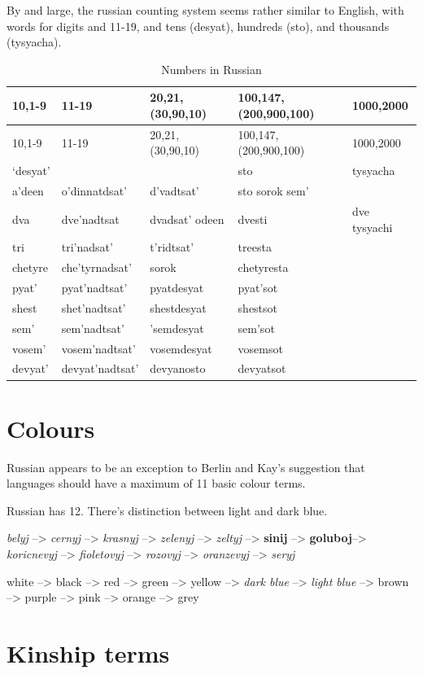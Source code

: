 \documentclass[
  a4paperpaper,
]{report}
\begin{document}
By and large, the russian counting system seems rather similar to
English, with words for digits and 11-19, and tens (desyat), hundreds
(sto), and thousands (tysyacha).

\begin{longtable}[]{@{}lllll@{}}
\caption{Numbers in Russian}\tabularnewline
\toprule
10,1-9 & 11-19 & 20,21,(30,90,10) & 100,147, (200,900,100) &
1000,2000\tabularnewline
\midrule
\endfirsthead
\toprule
10,1-9 & 11-19 & 20,21,(30,90,10) & 100,147, (200,900,100) &
1000,2000\tabularnewline
\midrule
\endhead
`desyat' & & & sto & tysyacha\tabularnewline
a'deen & o'dinnatdsat' & d'vadtsat' & sto sorok sem' &\tabularnewline
dva & dve'nadtsat & dvadsat' odeen & dvesti & dve
tysyachi\tabularnewline
tri & tri'nadsat' & t'ridtsat' & treesta &\tabularnewline
chetyre & che'tyrnadsat' & sorok & chetyresta &\tabularnewline
pyat' & pyat'nadtsat' & pyatdesyat & pyat'sot &\tabularnewline
shest & shet'nadtsat' & shestdesyat & shestsot &\tabularnewline
sem' & sem'nadtsat' & 'semdesyat & sem'sot &\tabularnewline
vosem' & vosem'nadtsat' & vosemdesyat & vosemsot &\tabularnewline
devyat' & devyat'nadtsat' & devyanosto & devyatsot &\tabularnewline
\bottomrule
\end{longtable}

\hypertarget{colours}{%
\section{Colours}\label{colours}}

Russian appears to be an exception to Berlin and Kay's suggestion that
languages should have a maximum of 11 basic colour terms.

Russian has 12. There's distinction between light and dark blue.

\emph{belyj} --\textgreater{} \emph{cernyj} --\textgreater{}
\emph{krasnyj} --\textgreater{} \emph{zelenyj} --\textgreater{}
\emph{zeltyj} --\textgreater{} \textbf{sinij} --\textgreater{}
\textbf{goluboj}--\textgreater{} \emph{koricnevyj} --\textgreater{}
\emph{fioletovyj} --\textgreater{} \emph{rozovyj} --\textgreater{}
\emph{oranzevyj} --\textgreater{} \emph{seryj}

white --\textgreater{} black --\textgreater{} red --\textgreater{} green
--\textgreater{} yellow --\textgreater{} \emph{dark blue}
--\textgreater{} \emph{light blue} --\textgreater{} brown
--\textgreater{} purple --\textgreater{} pink --\textgreater{} orange
--\textgreater{} grey

\hypertarget{kinship-terms}{%
\section{Kinship terms}\label{kinship-terms}}
\end{document}

